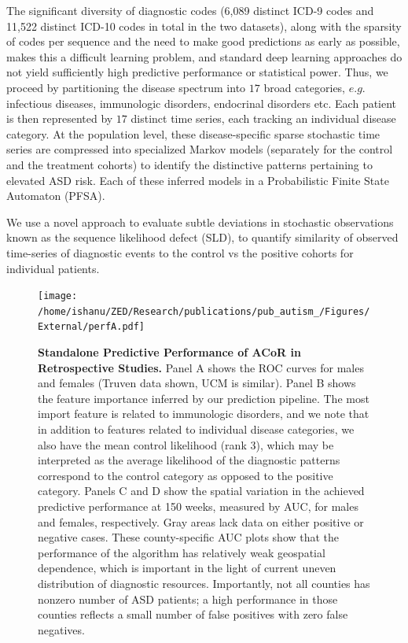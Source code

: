 \documentclass[onecolumn, compsoc,11pt]{IEEEtran}
\renewcommand{\captionN}[1]{\caption{\color{CadetBlue4!80!black} \sffamily \fontsize{9}{10}\selectfont #1  }}
\def\ZERO{ACoR\xspace}
\def\treatment{positive\xspace}
\begin{document}
The significant diversity of diagnostic codes (6,089 distinct ICD-9 codes and 11,522 distinct ICD-10 codes in total in the two datasets), along with the sparsity of codes per sequence and the need to make good predictions as early as possible,  makes this a difficult learning problem, and standard deep learning approaches do not yield sufficiently high predictive performance or statistical power. %
 Thus, we proceed by  partitioning the  disease spectrum into $17 $ broad categories, $e.g.$ infectious diseases, immunologic disorders, endocrinal disorders etc. Each patient is then represented by $17$ distinct time series, each  tracking an individual disease category. At the population level, these disease-specific sparse stochastic time series are  compressed into specialized Markov models (separately for the control and the treatment cohorts) to identify  the distinctive patterns  pertaining to elevated ASD risk. Each of these inferred models in a Probabilistic Finite State Automaton (PFSA). %

We use a novel approach to evaluate subtle deviations in stochastic observations known as the sequence likelihood defect (SLD), to  quantify similarity of observed time-series of diagnostic events to the control vs the \treatment cohorts for individual patients.
\begin{figure}[!t]

  \centering  
   
  \texttt{[image: /home/ishanu/ZED/Research/publications/pub\_autism\_/Figures/External/perfA.pdf]}

  \captionN{\textbf{Standalone Predictive Performance of \ZERO in Retrospective Studies.} Panel A shows the ROC curves for males and females (Truven data shown, UCM is similar). Panel B shows the feature importance inferred by our prediction pipeline. The most import feature is related to immunologic disorders, and we note that in addition to features related to individual disease categories, we also have the mean control likelihood (rank 3), which may be interpreted as the average likelihood of the diagnostic patterns correspond to the control category as opposed to the \treatment category. Panels C and D show the spatial variation in the achieved predictive performance at 150 weeks, measured by AUC, for males and females, respectively. Gray areas lack data on either positive or negative cases. These county-specific AUC plots show that the performance of the algorithm has  relatively weak geospatial dependence, which is important in the light of current uneven distribution of diagnostic resources. Importantly, not all counties has nonzero number of ASD patients; a high performance in those counties reflects a small number of false positives with zero false negatives.
  }\label{fig1}
\end{figure}
  
\end{document}
